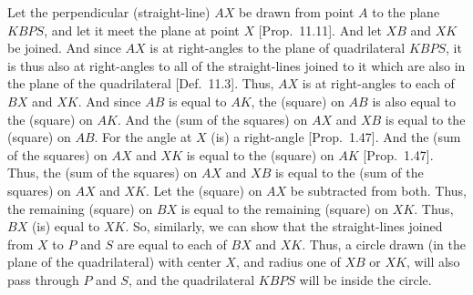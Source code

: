 \begin{Parallel}{}{}
{Let the perpendicular (straight-line) $AX$ be drawn from point $A$ to the plane $KBPS$, and let it meet the
plane at point $X$ [Prop.~11.11]. And let $XB$ and $XK$ be joined. And since $AX$ is at right-angles to the plane
of quadrilateral $KBPS$, it is thus also at right-angles to all of the  straight-lines joined to it which are also in the plane of the quadrilateral
[Def.~11.3]. Thus, $AX$ is at right-angles to each of $BX$ and $XK$. And since $AB$ is equal
to $AK$, the (square) on $AB$ is also equal to the (square) on $AK$. And the (sum of the
squares) on $AX$ and $XB$ is equal to the (square) on $AB$. For the angle at $X$ (is) a right-angle [Prop.~1.47]. And the (sum of the squares) on $AX$ and $XK$ is equal to the (square) on
$AK$ [Prop.~1.47]. Thus, the (sum of the squares) on $AX$ and $XB$
is equal to the (sum of the squares) on $AX$ and $XK$. Let the (square) on $AX$ be subtracted from both. Thus, the
remaining (square) on $BX$ is equal to the remaining (square) on $XK$. Thus, $BX$ (is) equal to $XK$. So, similarly,
we can show that  the straight-lines joined from $X$ to $P$ and $S$ are equal to each of $BX$ and $XK$.
Thus, a circle drawn (in the plane of the quadrilateral) with center $X$, and radius one of $XB$ or $XK$, will
also pass through $P$ and $S$, and the quadrilateral $KBPS$ will be inside the circle.

}
\end{Parallel}
